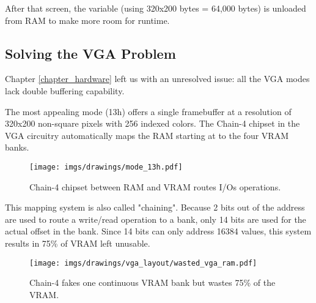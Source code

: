 \documentclass[book.tex]{subfiles}
\begin{document}
\begin{minipage}{\textwidth}

\end{minipage}
After that screen, the  variable (using 320x200 bytes = 64,000 bytes) is unloaded from RAM to make more room for runtime.\\
\par




















\subsection{Solving the VGA Problem}
Chapter \ref{chapter_hardware}  left us with an unresolved issue: all the VGA modes lack double buffering capability.\\
\par
 The most appealing mode (13h) offers a single framebuffer at a resolution of 320x200 non-square pixels with 256 indexed colors. The Chain-4 chipset in the VGA circuitry automatically maps the RAM starting at  to the four VRAM banks. 
 \par
 \begin{figure}[H]
\centering
      \texttt{[image: imgs/drawings/mode\_13h.pdf]}
      \caption{Chain-4 chipset between RAM and VRAM routes I/Os operations.}
\end{figure}

This mapping system is also called "chaining". Because 2 bits out of the address are used to route a write/read operation to a bank, only 14 bits are used for the actual offset in the bank. Since 14 bits can only address 16384 values, this system results in 75\% of VRAM left unusable.\\

\begin{figure}[H]
\centering
 \texttt{[image: imgs/drawings/vga\_layout/wasted\_vga\_ram.pdf]}
  \caption{Chain-4 fakes one continuous VRAM bank but wastes 75\% of the VRAM.}
 \end{figure}
\end{document}
